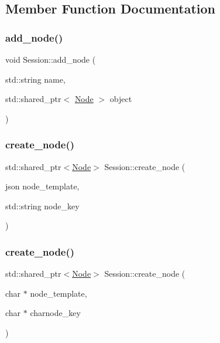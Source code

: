 \subsection{Member Function Documentation}
\mbox{\label{class_session_a7b5d3b9db809cc54e515639b78b0e811}} 
\subsubsection{\texorpdfstring{add\+\_\+node()}{add\_node()}}
{\footnotesize\ttfamily void Session\+::add\+\_\+node (\begin{DoxyParamCaption}\item[{std\+::string}]{name,  }\item[{std\+::shared\+\_\+ptr$<$ \hyperlink{class_node}{Node} $>$}]{object }\end{DoxyParamCaption})}

\mbox{\label{class_session_aa546642e267c2117abaee79025d6e1a8}} 
\subsubsection{\texorpdfstring{create\+\_\+node()}{create\_node()}\hspace{0.1cm}{\footnotesize\ttfamily [1/2]}}
{\footnotesize\ttfamily std\+::shared\+\_\+ptr$<$\hyperlink{class_node}{Node}$>$ Session\+::create\+\_\+node (\begin{DoxyParamCaption}\item[{json}]{node\+\_\+template,  }\item[{std\+::string}]{node\+\_\+key }\end{DoxyParamCaption})}

\mbox{\label{class_session_a4829a2015ef1ceaf78c49c953b54258e}} 
\subsubsection{\texorpdfstring{create\+\_\+node()}{create\_node()}\hspace{0.1cm}{\footnotesize\ttfamily [2/2]}}
{\footnotesize\ttfamily std\+::shared\+\_\+ptr$<$\hyperlink{class_node}{Node}$>$ Session\+::create\+\_\+node (\begin{DoxyParamCaption}\item[{char $\ast$}]{node\+\_\+template,  }\item[{char $\ast$}]{charnode\+\_\+key }\end{DoxyParamCaption})}

